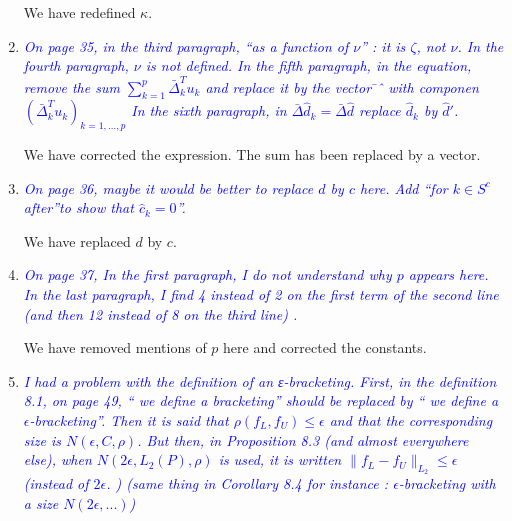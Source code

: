 \documentclass[pdftex,12pt]{article}
\let\hat\widehat
\def\rc#1{{\it\textcolor{blue}{#1}}\smallskip}
\begin{document}
\begin{enumerate}
We have redefined $\kappa$. 



\item \rc{On page 35, in the third paragraph, ``as a function of $\nu$'' : it is
$\zeta$, not $\nu$. In the fourth paragraph, $\nu$ is not defined. In the fifth
paragraph, in the equation, remove the sum $\sum_{k=1}^p
\bar\Delta_k^T u_k$  and replace
it by the vector ̄ˆ with componen$(\bar\Delta_k^T u_k)_{k=1,\ldots, p}$ In the sixth paragraph,
in $\bar\Delta \hat d_k = \bar\Delta\hat d$ replace $\hat d_k$ by
$\hat d'$.}

We have corrected the expression. The sum has been replaced by a vector.

\item \rc{On page 36, maybe it would be better to replace $d$ by $c$ here. Add
``for $k\in S^c$ after''to show that $\hat c_k =0$''.}

We have replaced $d$ by $c$. 

\item \rc{On page 37, In the first paragraph, I do not understand why $p$ appears
here. In the last paragraph, I find 4 instead of 2 on the first term of
the second line (and then 12 instead of 8 on the third line) .}

We have removed mentions of $p$ here and corrected the constants.


\item \rc{I had a problem with the definition of an ε-bracketing. First, in the
definition 8.1, on page 49, `` we define a bracketing'' should be
replaced by `` we define a $\epsilon$-bracketing''. Then it is said that $\rho(f_L ,
f_U ) \leq \epsilon$ and that the corresponding size is $N(\epsilon,C,\rho)$. But then, in
Proposition 8.3 (and almost everywhere else), when $N(2\epsilon,L_2(P),\rho)$ is
used, it is written $\|f_L − f_U \|_{L_2} \leq \epsilon$ (instead of $2\epsilon$. ) (same thing in
Corollary 8.4 for instance : $\epsilon$-bracketing with a size $N(2\epsilon,...)$)}


\end{enumerate}
\end{document}
